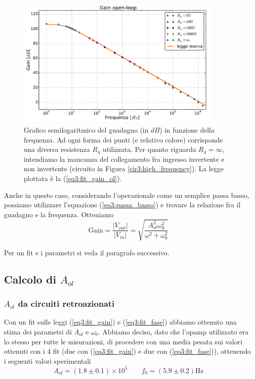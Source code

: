 \begin{figure}[h]
	\centering
	\includegraphics[width=0.9\textwidth]{../E03/latex/gol.pdf}
	\caption{Grafico semilogaritmico del guadagno (in $dB$) in funzione della frequenza. Ad ogni forma dei punti (e relativo colore) corrisponde una diversa resistenza $R_4$ utilizzata. Per quanto riguarda $R_4=\infty$, intendiamo la mancanza del collegamento fra ingresso invertente e non invertente (circuito in Figura \ref{cir3:high_frequency}). La legge plottata è la (\ref{eq3:fit_gain_ol}).}
  \label{cir3:gain_open_loop}
\end{figure}

Anche in questo caso, considerando l'operazionale come un semplice passa basso, possiamo utilizzare l'equazione (\ref{eq3:passa_basso}) e trovare la relazione fra il guadagno e la frequenza. Otteniamo
\begin{equation}
\mathrm{Gain}=\frac{|V_{out}|}{|V_{in}|}=\sqrt{\frac{A_{ol}^2 \omega_0^2}{\omega^2 + \omega_0^2}}
\label{eq3:fit_gain_ol}
\end{equation}

Per un fit e i parametri si veda il paragrafo successivo.

\subsection{Calcolo di $A_{ol}$}
\label{par3:A_ol}

\subsubsection{$A_{ol}$ da circuiti retroazionati}

Con un fit sulle leggi (\ref{eq3:fit_gain}) e (\ref{eq3:fit_fase}) abbiamo ottenuto una stima dei parametri di $A_{ol}$ e $\omega_0$. Abbiamo deciso, dato che l'opamp utilizzato era lo stesso per tutte le misurazioni, di procedere con una media pesata sui valori ottenuti con i 4 fit (due con (\ref{eq3:fit_gain}) e due con (\ref{eq3:fit_fase})), ottenendo i seguenti valori sperimentali
$$A_{ol}=(1.8\pm0.1)\times 10^5 \qquad f_0=(5.9\pm0.2)\si{\hertz}$$

